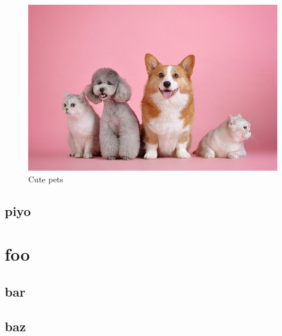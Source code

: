 \documentclass[dvipdfmx, 11pt, a4paper]{jsbook}
\begin{document}
\begin{figure}[h]
\centering
\includegraphics[scale=0.3]{figs/pets.jpg}
\caption{Cute pets}
\label{fig:pets}
\end{figure}


\section{piyo}

\blindtext

\chapter{foo}

\blindtext

\section{bar}

\blindtext

\section{baz}

\blindtext


\end{document}
